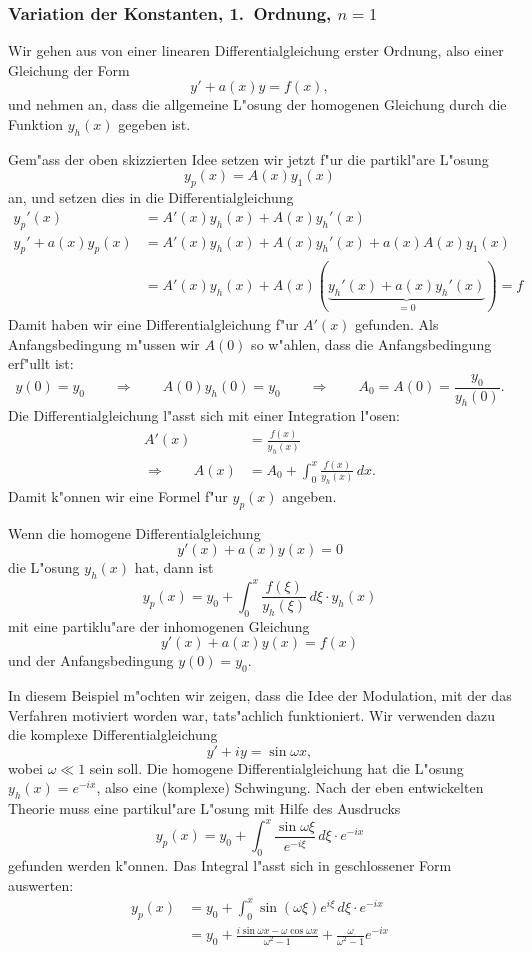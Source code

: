\subsubsection{Variation der Konstanten, 1.~Ordnung, $n=1$}
Wir gehen aus von einer linearen Differentialgleichung erster Ordnung,
also einer Gleichung der Form
\[
y' + a(x)y=f(x),
\]
und nehmen an, dass die allgemeine L"osung der homogenen Gleichung
durch die Funktion $y_h(x)$ gegeben ist.

Gem"ass der oben skizzierten Idee setzen wir jetzt f"ur die partikl"are
L"osung 
\[
y_p(x)=A(x) y_1(x)
\]
an, und setzen dies in die Differentialgleichung
\begin{align*}
y_p'(x)
&=
A'(x)y_h(x)+A(x)y_h'(x)
\\
y_p'+a(x)y_p(x)
&=
A'(x)y_h(x)+A(x)y_h'(x)
+
a(x)A(x)y_1(x)
\\
&=
A'(x)y_h(x)+A(x)(\underbrace{y_h'(x)+a(x)y_h'(x)}_{\displaystyle =0})=f
\end{align*}
Damit haben wir eine Differentialgleichung f"ur $A'(x)$ gefunden.
Als Anfangsbedingung m"ussen wir $A(0)$ so w"ahlen, dass
die Anfangsbedingung erf"ullt ist:
\[
y(0)=y_0
\qquad\Rightarrow\qquad
A(0)y_h(0)=y_0
\qquad\Rightarrow\qquad
A_0=A(0)=\frac{y_0}{y_h(0)}.
\]
Die Differentialgleichung l"asst sich mit einer Integration l"osen:
\begin{align*}
A'(x)
&=
\frac{f(x)}{y_h(x)}
\\
\Rightarrow\qquad
A(x)
&=
A_0+
\int_0^x \frac{f(x) }{y_h(x)}\,dx.
\end{align*}
Damit k"onnen wir eine Formel f"ur $y_p(x)$ angeben.

\begin{satz}
Wenn die homogene Differentialgleichung
\[
y'(x)+a(x)y(x) = 0
\]
die L"osung $y_h(x)$ hat, dann ist
\[
y_p(x)=y_0+\int_0^x\frac{f(\xi)}{y_h(\xi)}\,d\xi\cdot y_h(x)
\]
mit eine partiklu"are der inhomogenen Gleichung
\[
y'(x)+a(x)y(x)=f(x)
\]
und der Anfangsbedingung $y(0)=y_0$.
\end{satz}

\begin{beispiel}
In diesem Beispiel m"ochten wir zeigen, dass die Idee der Modulation,
mit der das Verfahren motiviert worden war, tats"achlich funktioniert.
Wir verwenden dazu die komplexe Differentialgleichung
\[
y'+iy=\sin \omega x,
\]
wobei $\omega \ll 1$ sein soll.
Die homogene Differentialgleichung hat die L"osung $y_h(x)=e^{-ix}$,
also eine (komplexe) Schwingung.
Nach der eben entwickelten Theorie muss eine partikul"are L"osung
mit Hilfe des Ausdrucks
\[
y_p(x)=y_0 +\int_0^x\frac{\sin\omega\xi}{e^{-i\xi}}\,d\xi\cdot e^{-ix}
\]
gefunden werden k"onnen.
Das Integral l"asst sich in geschlossener Form auswerten:
\begin{align*}
y_p(x)
&=
y_0 + \int_0^x \sin(\omega\xi)e^{i\xi}\,d\xi\cdot e^{-ix}
\\
&=
y_0+
\frac{i\sin \omega x- \omega \cos \omega x}{\omega^2-1}
+\frac{\omega}{\omega^2-1}e^{-ix}
\end{align*}
\end{beispiel}

